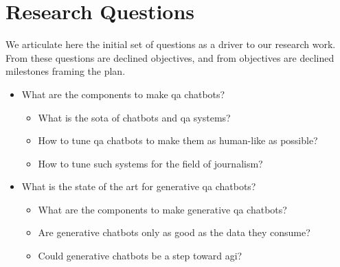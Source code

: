 \section{Research Questions}
We articulate here the initial set of questions as a driver to our research work. From these questions are declined objectives, and from objectives are declined milestones framing the plan.

\begin{itemize}[noitemsep]
    \item What are the components to make \gls{qa} chatbots?
    \begin{itemize}[noitemsep]
        \item What is the \gls{sota} of chatbots and \gls{qa} systems?
        \item How to tune \gls{qa} chatbots to make them as human-like as possible?
        \item How to tune such systems for the field of journalism?
    \end{itemize}
    \item What is the state of the art for \gls{generative} \gls{qa} chatbots?
    \begin{itemize}[noitemsep]
        \item What are the components to make \gls{generative} \gls{qa} chatbots?
        \item Are \gls{generative} chatbots only as good as the data they consume?
        \item Could \gls{generative} chatbots be a step toward \gls{agi}?
    \end{itemize}
\end{itemize}


